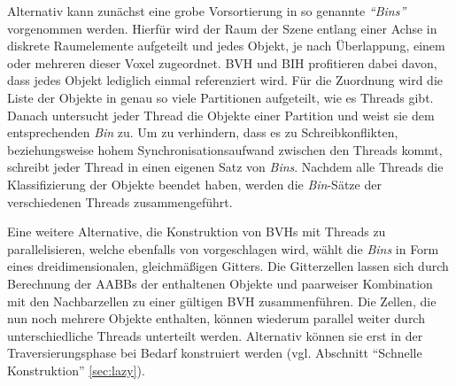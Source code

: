 Alternativ kann zunächst eine grobe Vorsortierung in so genannte \textit{``Bins''} vorgenommen werden. Hierfür wird der Raum der Szene entlang einer Achse in diskrete Raumelemente aufgeteilt und jedes Objekt, je nach Überlappung, einem oder mehreren dieser Voxel zugeordnet. BVH und BIH profitieren dabei davon, dass jedes Objekt lediglich einmal referenziert wird.
Für die Zuordnung wird die Liste der Objekte in genau so viele Partitionen aufgeteilt, wie es Threads gibt. Danach untersucht jeder Thread die Objekte einer Partition und weist sie dem entsprechenden \textit{Bin} zu.
Um zu verhindern, dass es zu Schreibkonflikten, beziehungsweise hohem Synchronisationsaufwand zwischen den Threads kommt, schreibt jeder Thread in einen eigenen Satz von \textit{Bins}. Nachdem alle Threads die Klassifizierung der Objekte beendet haben, werden die \textit{Bin}-Sätze der verschiedenen Threads zusammengeführt.\citep{Wald07}

Eine weitere Alternative, die Konstruktion von BVHs mit Threads zu parallelisieren, welche ebenfalls von \cite{Wald07}  vorgeschlagen wird, wählt die \textit{Bins} in Form eines dreidimensionalen, gleichmäßigen Gitters. Die Gitterzellen lassen sich durch Berechnung der AABBs der enthaltenen Objekte und paarweiser Kombination mit den Nachbarzellen zu einer gültigen BVH zusammenführen. Die Zellen, die nun noch mehrere Objekte enthalten, können wiederum parallel weiter durch unterschiedliche Threads unterteilt werden. Alternativ können sie erst in der Traversierungsphase bei Bedarf konstruiert werden (vgl. Abschnitt ``Schnelle Konstruktion'' \ref{sec:lazy}).

